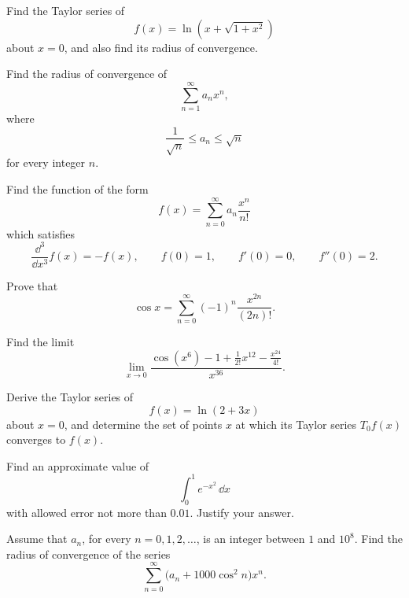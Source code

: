 \begin{problem}
Find the Taylor series of
\[
f(x)=\ln\!\left(x+\sqrt{1+x^2}\right)
\]
about $x=0$, and also find its radius of convergence.
\end{problem}

\begin{problem}
Find the radius of convergence of
\[
\sum_{n=1}^{\infty}a_nx^n,
\]
where
\[
\frac{1}{\sqrt n}\le a_n\le\sqrt n
\]
for every integer $n$.
\end{problem}

\begin{problem}
Find the function of the form
\[
f(x)=\sum_{n=0}^{\infty}a_n\frac{x^n}{n!}
\]
which satisfies
\[
\frac{\dd^3}{\dd x^3}f(x)=-f(x),
\qquad
f(0)=1,
\qquad
f'(0)=0,
\qquad
f''(0)=2.
\]
\end{problem}

\begin{problem}
\begin{problemsubparts}
\item Prove that
\[
\cos x=\sum_{n=0}^{\infty}(-1)^n\frac{x^{2n}}{(2n)!}.
\]
\item Find the limit
\[
\lim_{x\to0}
\frac{\cos(x^6)-1+\frac{1}{2!}x^{12}-\frac{x^{24}}{4!}}{x^{36}}.
\]
\end{problemsubparts}
\end{problem}

\begin{problem}
Derive the Taylor series of
\[
f(x)=\ln(2+3x)
\]
about $x=0$, and determine the set of points $x$ at which its Taylor series $T_0f(x)$ converges to $f(x)$.
\end{problem}

\begin{problem}
Find an approximate value of
\[
\int_0^1 e^{-x^2}\,\dd x
\]
with allowed error not more than $0.01$. Justify your answer.
\end{problem}

\begin{problem}
Assume that $a_n$, for every $n=0, 1, 2, \ldots$, is an integer between $1$ and $10^8$. Find the radius of convergence of the series
\[
\sum_{n=0}^{\infty}\bigl(a_n+1000\cos^2 n\bigr)x^n.
\]
\end{problem}

